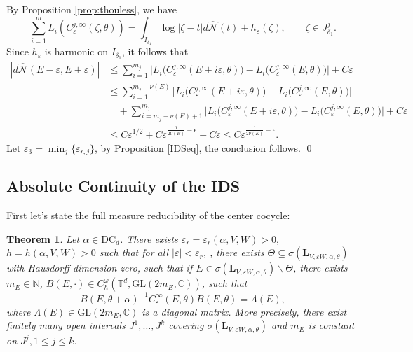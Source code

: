 \documentclass[reqno,11pt]{amsart}
\newtheorem{theorem}{Theorem}[section]
\newcommand{\C}{{\mathbb C}}
\newcommand{\T}{{\mathbb T}}
\def\GL{{\mathrm{GL}}}
\begin{document}
By Proposition \ref{prop:thouless}, we have $$\sum_{i=1}^m L_i(C_{\varepsilon}^{j,\infty}(\zeta,\theta))=\int_{I_{\delta_{1}}} \log|\zeta-t|d{\widehat{\mathcal{N}}}(t)+h_\varepsilon(\zeta),\qquad \zeta\in J^j_{\delta_{1}}.$$
Since $h_\varepsilon$ is harmonic on $I_{\delta_1}$, it follows that
$$
\begin{aligned}
|d{\widehat{\mathcal{N}}}(E-\varepsilon,E+\varepsilon)|
&\leq\sum_{i=1}^{m_j}\bigl|
L_i\bigl(C_{\varepsilon}^{j,\infty}(E+i\varepsilon,\theta)\bigr)
-L_i\bigl(C_{\varepsilon}^{j,\infty}(E,\theta)\bigr)\bigr|
+C\varepsilon\\
&\leq
\sum_{i=1}^{m_j-\nu(E)}\bigl|
L_i\bigl(C_{\varepsilon}^{j,\infty}(E+i\varepsilon,\theta)\bigr)
-L_i\bigl(C_{\varepsilon}^{j,\infty}(E,\theta)\bigr)\bigr|\\
&\quad+
\sum_{i=m_j-\nu(E)+1}^{m_j}
\bigl|L_i\bigl(C_{\varepsilon}^{j,\infty}(E+i\varepsilon,\theta)\bigr)-
L_i\bigl(C_{\varepsilon}^{j,\infty}(E,\theta)\bigr)\bigr|
+C\varepsilon\\
&\leq
C\varepsilon^{1/2}+C\varepsilon^{\frac{1}{2\nu(E)}-\epsilon}
+C\varepsilon\leq C\varepsilon^{\frac{1}{2\nu(E)}-\epsilon}. 
\end{aligned}
$$
Let $\varepsilon_3=\min_j\{\varepsilon_{r,j}\}$, by Proposition \ref{IDSeq}, the conclusion follows. \qed
\subsection{Absolute Continuity of the IDS}

First let's state the full measure reducibility of the center cocycle:\begin{theorem}\label{main:reduce}
Let $\alpha\in \mathrm{DC}_d$.  There exists $\varepsilon_{r}=\varepsilon_r(\alpha,V,W)>0,$ $h=h(\alpha,V,W)>0$  such that for all $|\varepsilon|<\varepsilon_r$, , there exists $\Theta\subseteq \sigma(\mathbf{L}_{V,\varepsilon W,\alpha,\theta})$ with Hausdorff dimension zero, such that if $E\in\sigma(\mathbf{L}_{V,\varepsilon W,\alpha,\theta})\backslash \Theta$,  there exists $m_E\in \mathbb{N}$, $B(E,\cdot)\in C_{h}^{\omega}(\T^{d},\GL(2m_E,\C))$,  such that
$$
B(E,\theta+\alpha)^{-1}C_{\varepsilon}^\infty(E,\theta)B(E,\theta)=\Lambda(E),
$$  where $\Lambda(E)\in\GL(2m_E,\C)$ is a diagonal matrix. More precisely, there exist finitely many open intervals $J^1,\ldots,J^k$ covering $\sigma(\mathbf L_{V,\varepsilon W,\alpha,\theta})$
and $m_E$ is constant on $J^j,1\leq j\leq k$.
\end{theorem}
\end{document}
